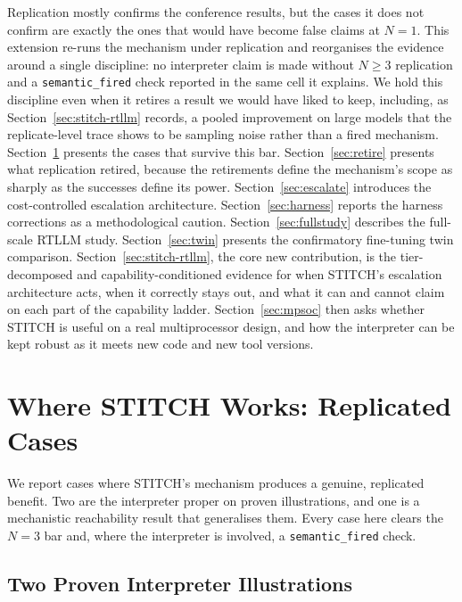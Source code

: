\documentclass[11pt]{article}
\begin{document}
Replication mostly confirms the conference results, but the cases it does not
confirm are exactly the ones that would have become false claims at $N{=}1$.
This extension re-runs the mechanism under replication and reorganises the
evidence around a single discipline: no interpreter claim is made without
$N{\geq}3$ replication and a \texttt{semantic\_fired} check reported in the
same cell it explains. We hold this discipline even when it retires a result
we would have liked to keep, including, as Section~\ref{sec:stitch-rtllm}
records, a pooled improvement on large models that the replicate-level trace
shows to be sampling noise rather than a fired mechanism. Section~\ref{sec:worked}
presents the cases that survive this bar. Section~\ref{sec:retire} presents
what replication retired, because the retirements define the mechanism's scope
as sharply as the successes define its power. Section~\ref{sec:escalate}
introduces the cost-controlled escalation architecture. Section~\ref{sec:harness}
reports the harness corrections as a methodological caution.
Section~\ref{sec:fullstudy} describes the full-scale RTLLM study.
Section~\ref{sec:twin} presents the confirmatory fine-tuning twin comparison.
Section~\ref{sec:stitch-rtllm}, the core new contribution, is the
tier-decomposed and capability-conditioned evidence for when STITCH's
escalation architecture acts, when it correctly stays out, and what it can and
cannot claim on each part of the capability ladder.
Section~\ref{sec:mpsoc} then asks whether STITCH is useful on a real
multiprocessor design, and how the interpreter can be kept robust as it meets
new code and new tool versions.

\section{Where STITCH Works: Replicated Cases}
\label{sec:worked}

We report cases where STITCH's mechanism produces a genuine, replicated
benefit. Two are the interpreter proper on proven illustrations, and one is a
mechanistic reachability result that generalises them. Every case here clears
the $N{=}3$ bar and, where the interpreter is involved, a
\texttt{semantic\_fired} check.

\subsection{Two Proven Interpreter Illustrations}
\label{sec:worked-illus}
\end{document}
